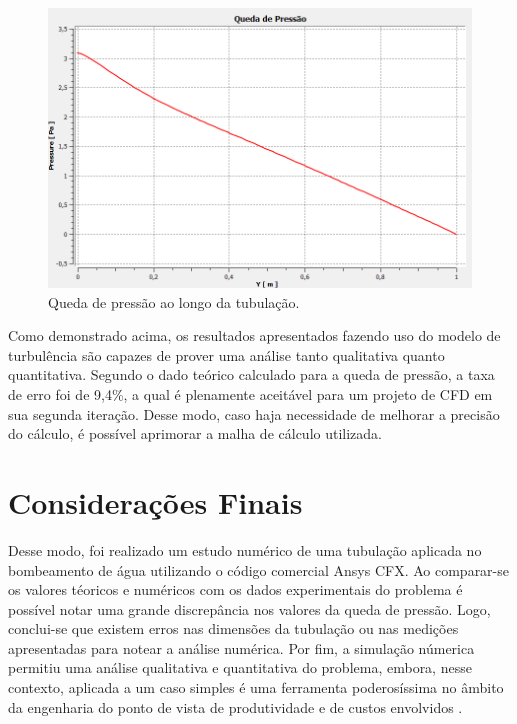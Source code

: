 \documentclass[12pt]{article}
\begin{document}
\begin{figure}[H]
    \centering
    \includegraphics[width=.5\textwidth]{fig/pressure_loss_turbulent.png}
    \caption{Queda de pressão ao longo da tubulação.}
		\label{fig:isometric}
\end{figure}

Como demonstrado acima, os resultados apresentados fazendo uso do modelo de turbulência são capazes de prover uma análise tanto qualitativa quanto quantitativa. Segundo o dado teórico calculado para a queda de pressão, a taxa de erro foi de 9,4\%, a qual é plenamente aceitável para um projeto de CFD em sua segunda iteração. Desse modo, caso haja necessidade de melhorar a precisão do cálculo, é possível aprimorar a malha de cálculo utilizada.

\section{Considerações Finais}
Desse modo, foi realizado um estudo numérico de uma tubulação aplicada no bombeamento de água utilizando o código comercial Ansys CFX. Ao comparar-se os valores téoricos e numéricos com os dados experimentais do problema é possível notar uma grande discrepância nos valores da queda de pressão. Logo, conclui-se que existem erros nas dimensões da tubulação ou nas medições apresentadas para notear a análise numérica. Por fim, a simulação númerica permitiu uma análise qualitativa e quantitativa do problema, embora, nesse contexto, aplicada a um caso simples é uma ferramenta poderosíssima no âmbito da engenharia do ponto de vista de produtividade e de custos envolvidos \cite{cfd}. 




\end{document}
